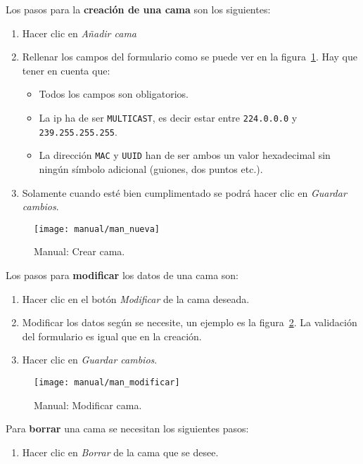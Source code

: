 Los pasos para la \textbf{creación de una cama} son los siguientes:
\begin{enumerate}
	\item Hacer clic en \textit{Añadir cama}
	\item Rellenar los campos del formulario como se puede ver en la figura~\ref{fig:man_new_bed}. Hay que tener en cuenta que:
	\begin{itemize}
		\item Todos los campos son obligatorios.
		\item La ip ha de ser \texttt{MULTICAST}, es decir estar entre \texttt{224.0.0.0} y \texttt{239.255.255.255}.
		\item La dirección \texttt{MAC} y \texttt{UUID} han de ser ambos un valor hexadecimal sin ningún símbolo adicional (guiones, dos puntos etc.).
	\end{itemize}
	\item Solamente cuando esté bien cumplimentado se podrá hacer clic en \textit{Guardar cambios}.
\end{enumerate}

\begin{figure}
	\centering
	\texttt{[image: manual/man\_nueva]}
	\caption{Manual: Crear cama.}
	\label{fig:man_new_bed}
\end{figure}

Los pasos para \textbf{modificar} los datos de una cama son:
\begin{enumerate}
	\item Hacer clic en el botón \textit{Modificar} de la cama deseada.
	\item Modificar los datos según se necesite, un ejemplo es la figura~\ref{fig:man_mod_bed}. La validación del formulario es igual que en la creación.
	\item Hacer clic en \textit{Guardar cambios}.
\end{enumerate}

\begin{figure}
	\centering
	\texttt{[image: manual/man\_modificar]}
	\caption{Manual: Modificar cama.}
	\label{fig:man_mod_bed}
\end{figure}

Para \textbf{borrar} una cama se necesitan los siguientes pasos:
\begin{enumerate}
	\item Hacer clic en \textit{Borrar} de la cama que se desee.
\end{enumerate}

